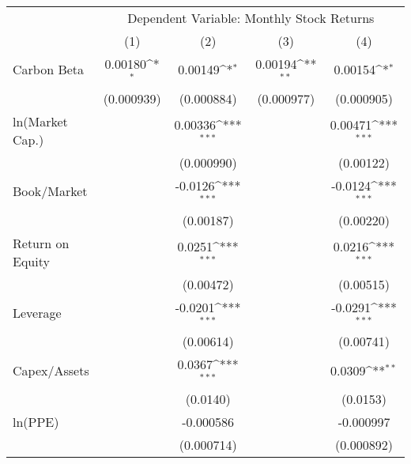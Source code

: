 {
\def\sym#1{\ifmmode^{#1}\else\(^{#1}\)\fi}
\begin{tabular}{l*{4}{c}}
\hline\hline
                    &\multicolumn{4}{c}{Dependent Variable: Monthly Stock Returns}                          \\\cmidrule(lr){2-5}
                    &\multicolumn{1}{c}{(1)}         &\multicolumn{1}{c}{(2)}         &\multicolumn{1}{c}{(3)}         &\multicolumn{1}{c}{(4)}         \\
\hline
Carbon Beta         &     0.00180\sym{*}  &     0.00149\sym{*}  &     0.00194\sym{**} &     0.00154\sym{*}  \\
                    &  (0.000939)         &  (0.000884)         &  (0.000977)         &  (0.000905)         \\
ln(Market Cap.)     &                     &     0.00336\sym{***}&                     &     0.00471\sym{***}\\
                    &                     &  (0.000990)         &                     &   (0.00122)         \\
Book/Market         &                     &     -0.0126\sym{***}&                     &     -0.0124\sym{***}\\
                    &                     &   (0.00187)         &                     &   (0.00220)         \\
Return on Equity    &                     &      0.0251\sym{***}&                     &      0.0216\sym{***}\\
                    &                     &   (0.00472)         &                     &   (0.00515)         \\
Leverage            &                     &     -0.0201\sym{***}&                     &     -0.0291\sym{***}\\
                    &                     &   (0.00614)         &                     &   (0.00741)         \\
Capex/Assets        &                     &      0.0367\sym{***}&                     &      0.0309\sym{**} \\
                    &                     &    (0.0140)         &                     &    (0.0153)         \\
ln(PPE)             &                     &   -0.000586         &                     &   -0.000997         \\
                    &                     &  (0.000714)         &                     &  (0.000892)         \\

\end{tabular}}
